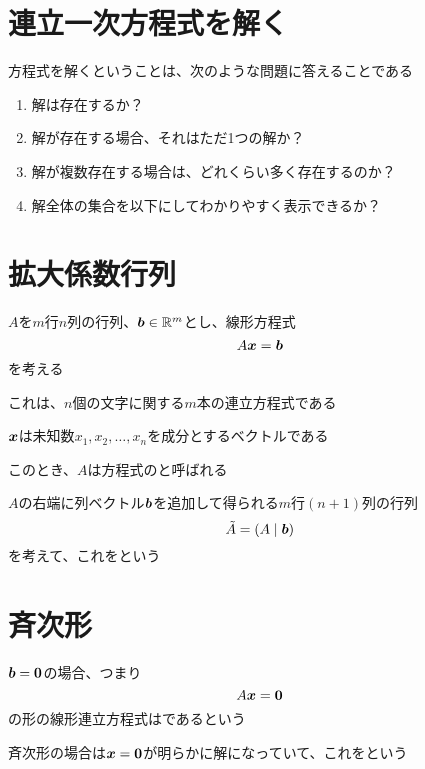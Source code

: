 \documentclass[../../../topic_linear-algebra]{subfiles}
\begin{document}
\sectionline
\section{連立一次方程式を解く}

方程式を解くということは、次のような問題に答えることである

\begin{enumerate}[label=\Alph*.]
  \item 解は存在するか？
  \item 解が存在する場合、それはただ1つの解か？
  \item 解が複数存在する場合は、どれくらい多く存在するのか？
  \item 解全体の集合を以下にしてわかりやすく表示できるか？
\end{enumerate}

\sectionline
\section{拡大係数行列}

$A$を$m$行$n$列の行列、$\vb*{b} \in \mathbb{R}^m$とし、線形方程式
\begin{equation*}
  A\vb*{x} = \vb*{b}
\end{equation*}
を考える

これは、$n$個の文字に関する$m$本の連立方程式である

$\vb*{x}$は未知数$x_1, x_2, \dots, x_n$を成分とするベクトルである

\br

このとき、$A$は方程式のと呼ばれる

$A$の右端に列ベクトル$\vb*{b}$を追加して得られる$m$行$(n+1)$列の行列
\begin{equation*}
  \tilde{A} = (A \mid \vb*{b})
\end{equation*}
を考えて、これをという

\sectionline
\section{斉次形}

$\vb*{b}=\vb*{0}$の場合、つまり
\begin{equation*}
  A\vb*{x} = \vb*{0}
\end{equation*}
の形の線形連立方程式はであるという

\br

斉次形の場合は$\vb*{x} = \vb*{0}$が明らかに解になっていて、これをという
\end{document}
